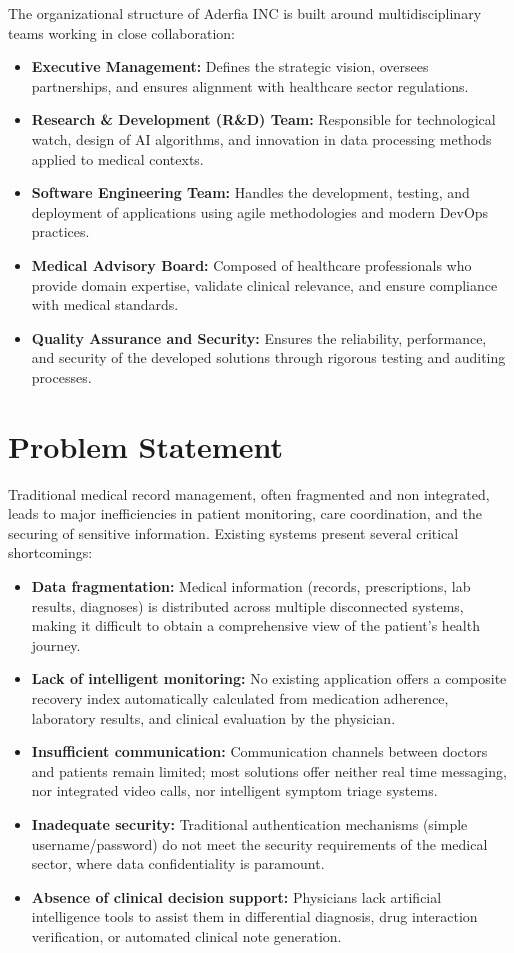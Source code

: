 \documentclass[12pt,a4paper,oneside]{report}
\begin{document}
The organizational structure of Aderfia INC is built around multidisciplinary teams working in close collaboration:

\begin{itemize}
    \item \textbf{Executive Management:} Defines the strategic vision, oversees partnerships, and ensures alignment with healthcare sector regulations.
    \item \textbf{Research \& Development (R\&D) Team:} Responsible for technological watch, design of AI algorithms, and innovation in data processing methods applied to medical contexts.
    \item \textbf{Software Engineering Team:} Handles the development, testing, and deployment of applications using agile methodologies and modern DevOps practices.
    \item \textbf{Medical Advisory Board:} Composed of healthcare professionals who provide domain expertise, validate clinical relevance, and ensure compliance with medical standards.
    \item \textbf{Quality Assurance and Security:} Ensures the reliability, performance, and security of the developed solutions through rigorous testing and auditing processes.
\end{itemize}

\section{Problem Statement}

Traditional medical record management, often fragmented and non integrated, leads to major inefficiencies in patient monitoring, care coordination, and the securing of sensitive information. Existing systems present several critical shortcomings:

\begin{itemize}
    \item \textbf{Data fragmentation:} Medical information (records, prescriptions, lab results, diagnoses) is distributed across multiple disconnected systems, making it difficult to obtain a comprehensive view of the patient's health journey.
    \item \textbf{Lack of intelligent monitoring:} No existing application offers a composite recovery index automatically calculated from medication adherence, laboratory results, and clinical evaluation by the physician.
    \item \textbf{Insufficient communication:} Communication channels between doctors and patients remain limited; most solutions offer neither real time messaging, nor integrated video calls, nor intelligent symptom triage systems.
    \item \textbf{Inadequate security:} Traditional authentication mechanisms (simple username/password) do not meet the security requirements of the medical sector, where data confidentiality is paramount.
    \item \textbf{Absence of clinical decision support:} Physicians lack artificial intelligence tools to assist them in differential diagnosis, drug interaction verification, or automated clinical note generation.
\end{itemize}
\end{document}
